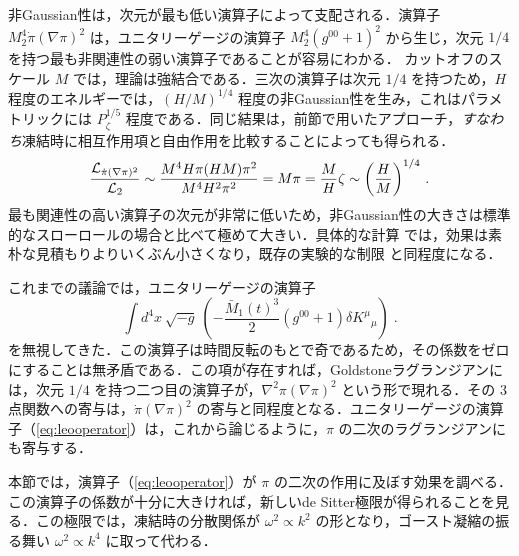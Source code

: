 非Gaussian性は，次元が最も低い演算子によって支配される．演算子 $M_2^4
\dot\pi (\nabla\pi)^2$ は，ユニタリーゲージの演算子 $M_2^4
(g^{00}+1)^2$ から生じ，次元 $1/4$ を持つ最も非関連性の弱い演算子であることが容易にわかる．
カットオフのスケール $M$ では，理論は強結合である．三次の演算子は次元 $1/4$ を持つため，$H$ 程度のエネルギーでは，$(H/M)^{1/4}$ 程度の非Gaussian性を生み，これはパラメトリックには $P_\zeta^{1/5}$ 程度である．同じ結果は，前節で用いたアプローチ，{\em すなわち}凍結時に相互作用項と自由作用を比較することによっても得られる．
\begin{equation}
\label{eq:NGghost}
\frac{{\cal L}_{\dot\pi(\nabla \pi)^2}}{{\cal L}_{2}}\sim
\frac{M^4 H \pi (H M) \pi^2}{M^4 H^2 \pi^2}=M \pi=\frac{M}{H}
\zeta\sim\left(\frac{H}{M}\right)^{1/4} \, .
\end{equation}
最も関連性の高い演算子の次元が非常に低いため，非Gaussian性の大きさは標準的なスローロールの場合と比べて極めて大きい．具体的な計算
\cite{Arkani-Hamed:2003juy} では，効果は素朴な見積もりよりいくぶん小さくなり，既存の実験的な制限 \cite{Creminelli:2006rz} と同程度になる．

これまでの議論では，ユニタリーゲージの演算子
\begin{equation}
\label{eq:leooperator}
\int \! d^4 x \: \sqrt{- g} \:
\left(-\frac{\bar M_1(t)^3}{2} (g^{00}+1)\delta K^\mu {}_\mu \right)\;.
\end{equation}
を無視してきた．この演算子は時間反転のもとで奇であるため，その係数をゼロにすることは無矛盾である．この項が存在すれば，Goldstoneラグランジアンには，次元 $1/4$ を持つ二つ目の演算子が，$\nabla^2\pi (\nabla\pi)^2$ という形で現れる．その 3 点関数への寄与は，$\dot\pi(\nabla\pi)^2$ の寄与と同程度となる．ユニタリーゲージの演算子（\ref{eq:leooperator}）は，これから論じるように，$\pi$ の二次のラグランジアンにも寄与する．

本節では，演算子（\ref{eq:leooperator}）が $\pi$ の二次の作用に及ぼす効果を調べる．この演算子の係数が十分に大きければ，新しいde Sitter極限が得られることを見る．この極限では，凍結時の分散関係が $\omega^2
\propto k^2$ の形となり，ゴースト凝縮の振る舞い $\omega^2
\propto k^4$ に取って代わる．

